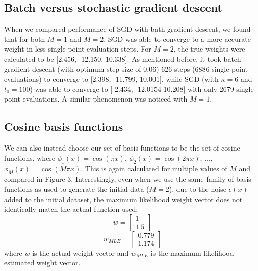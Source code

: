 \documentclass{article}
\begin{document}
\subsection{Batch versus stochastic gradient descent}
When we compared performance of SGD with bath gradient descent, we found that for both $M = 1$ and $M = 2$, SGD was able to converge to a more accurate weight in less single-point evaluation steps. For $M = 2$, the true weights were calculated to be [2.456, -12.150, 10.338]. As mentioned before, it took batch gradient descent (with optimum step size of 0.06) 626 steps (6886 single point evaluations) to converge to [2.398, -11.799, 10.001], while SGD (with $\kappa = 6$ and $t_{0} = 100$) was able to converge to [ 2.434, -12.0154  10.208] with only 2679 single point evaluations. A similar phenomenon was noticed with $M = 1$.

\subsection{Cosine basis functions}
We can also instead choose our set of basis functions to be the set of cosine functions, where $\phi_1(x) = \cos(\pi x)$, $\phi_2(x) = \cos(2 \pi x)$, ..., $\phi_M(x) = \cos(M \pi x)$. This is again calculated for multiple values of $M$ and compared in Figure 3. Interestingly, even when we use the same family of basis functions as used to generate the initial data ($M=2$), due to the noise $\epsilon(x)$ added to the initial dataset, the maximum likelihood weight vector does not identically match the actual function used:
$$ w =
\begin{bmatrix}
  1 \\
  1.5
\end{bmatrix}$$
$$ w_{MLE} =
\begin{bmatrix}
  0.779 \\
  1.174
\end{bmatrix}$$
where $w$ is the actual weight vector and $w_{MLE}$ is the maximum likelihood estimated weight vector.
\end{document}
